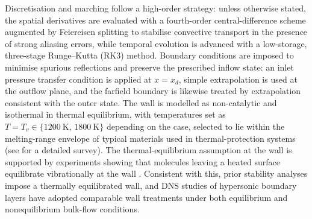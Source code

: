 Discretisation and marching follow a high-order strategy: unless otherwise stated, the spatial derivatives are evaluated with a fourth-order central-difference scheme augmented by Feiereisen splitting to stabilise convective transport in the presence of strong aliasing errors, while temporal evolution is advanced with a low-storage, three-stage Runge–Kutta (RK3) method. Boundary conditions are imposed to minimise spurious reflections and preserve the prescribed inflow state: an inlet pressure transfer condition is applied at $x=x_d$, simple extrapolation is used at the outflow plane, and the farfield boundary is likewise treated by extrapolation consistent with the outer state. The wall is modelled as non-catalytic and isothermal in thermal equilibrium, with temperatures set as $T=T_v\in\{1200~\mathrm{K},\,1800~\mathrm{K}\}$ depending on the case, selected to lie within the melting-range envelope of typical materials used in thermal-protection systems (see \cite{CedillosBarraza2016} for a detailed survey). The thermal-equilibrium assumption at the wall is supported by experiments showing that molecules leaving a heated surface equilibrate vibrationally at the wall \cite{Park1990,CandlerNompelis2021}. Consistent with this, prior stability analyses \cite{Hudson1997,MiroMiro2019,BitterShepherd2015} impose a thermally equilibrated wall, and DNS studies of hypersonic boundary layers \cite{Passiatoreetal2021,DiRenzo2021} have adopted comparable wall treatments under both equilibrium and nonequilibrium bulk-flow conditions.





